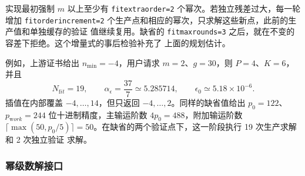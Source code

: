 \documentclass[11pt,a4paper]{ctexart}
\newcommand{\eps}{\epsilon}
\renewcommand{\_}{\origunderscore\allowbreak}
\begin{document}
实现最初强制 $m$ 以上至少有 \texttt{fit\_extra\_order=2} 个幂次。若独立残差过大，每一轮增加
\texttt{fit\_order\_increment=2} 个生产点和相应的幂次，只求解这些新点，此前的生产值和单独缓存的验证
值继续复用。缺省的 \texttt{fit\_max\_rounds=3} 之后，就在不变的容差下拒绝。这个增量式的事后检验补充了
上面的规划估计。

例如，上游证书给出 $n_{\min}=-4$，用户请求 $m=2$、$g=30$，则 $P=4$、$K=6$，并且
\begin{equation}
 N_{\mathrm fit}=19,\qquad
 \alpha_\eps=\frac{37}{7}\simeq5.285714,
 \qquad \eps_0\simeq5.18\times10^{-6}.
\end{equation}
插值在内部覆盖 $-4,\ldots,14$，但只返回 $-4,\ldots,2$。同样的缺省值给出 $p_0=122$、
$p_{\mathrm work}=244$ 位十进制精度，主输运阶数 $4p_0=488$，附加输运阶数
$\lceil\max(50,p_0/5)\rceil=50$。在缺省的两个验证点下，这一阶段执行 19 次生产求解和 2 次独立验证
求解。

\subsubsection{幂级数解接口}
\end{document}
